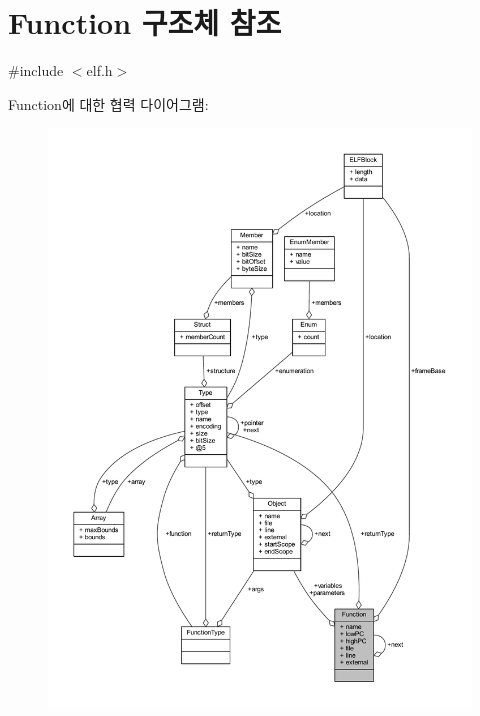 \hypertarget{struct_function}{}\section{Function 구조체 참조}
\label{struct_function}


{\ttfamily \#include $<$elf.\+h$>$}



Function에 대한 협력 다이어그램\+:\nopagebreak
\begin{figure}[H]
\begin{center}
\leavevmode
\includegraphics[width=350pt]{struct_function__coll__graph}
\end{center}
\end{figure}
